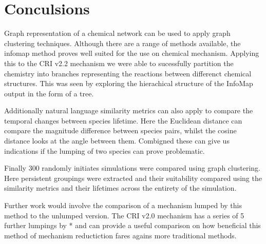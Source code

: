 % 
% 
% 
% 
% 
% 
% 
% 
% 
% 
% 
% 
% 
% 
% 
% 
% 
% 
% 
% 
% 
% 
% 
% 
% 
% 
% 
% 
% 







\section{Conculsions}
Graph representation of a chemical network can be used to apply graph clustering techniques. Although there are a range of methods available, the infomap method proves well suited for the use on chemical mechanism. Applying this to the CRI v2.2 mechanism we were able to sucessfully partition the chemistry into branches representing the reactions between differenct chemical structures. This was seen by exploring the hierachical structure of the InfoMap output in the form of a tree. 

Additionally natural language similarity metrics can also apply to compare the temporal changes between species lifetime. Here the Euclidean distance can compare the magnitude difference between species pairs, whilst the cosine distance looks at the angle between them. Combigned these can give us indications if the lumping of two species can prove problematic. 

Finally 300 randomly initiates simulations were compared using  graph clustering. Here persistent groupings were extracted and their suitability compared using the similarity metrics and their lifetimes across the entirety of the simulation. 

Further work would involve the comparison of a mechanism lumped by this method to the unlumped version. The CRI v2.0 mechanism has a series of 5 further lumpings by * and can provide a useful comparison on how beneficial this method of mechanism reductiction fares agains more traditional methods. 
